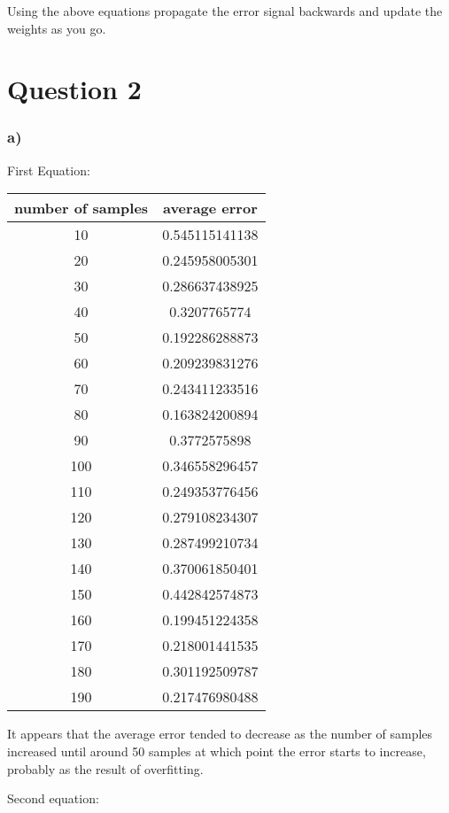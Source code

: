 \documentclass[12pt,a4paper]{article}
\begin{document}
Using the above equations propagate the error signal backwards and update the weights as you go.

\section*{Question 2}
\label{sec:question_2}
\subsubsection*{a)}
\label{ssub:a_}
First Equation:\\
\begin{tabular}{|c|c|}
\hline
\textbf{number of samples} & \textbf{average error}\\
	\hline
	10 & 0.545115141138\\
	\hline
	20 & 0.245958005301\\
	\hline
	30 & 0.286637438925\\
	\hline
	40 & 0.3207765774\\
	\hline
	50 & 0.192286288873\\
	\hline
	60 & 0.209239831276\\
	\hline
	70 & 0.243411233516\\
	\hline
	80 & 0.163824200894\\
	\hline
	90 & 0.3772575898\\
	\hline
	100 & 0.346558296457\\
	\hline
	110 & 0.249353776456\\
	\hline
	120 & 0.279108234307\\
	\hline
	130 & 0.287499210734\\
	\hline
	140 & 0.370061850401\\
	\hline
	150 & 0.442842574873\\
	\hline
	160 & 0.199451224358\\
	\hline
	170 & 0.218001441535\\
	\hline
	180 & 0.301192509787\\
	\hline
	190 & 0.217476980488\\
	\hline
\end{tabular}

It appears that the average error tended to decrease as the number of samples increased until around 50 samples at which point the error starts to increase, probably as the result of overfitting.

Second equation:
\end{document}
